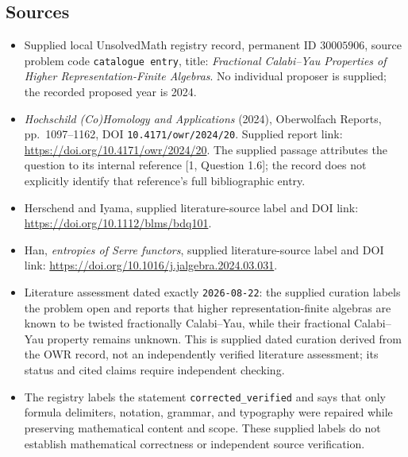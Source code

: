 \documentclass[11pt]{article}
\begin{document}
\subsection{Sources}
\begin{itemize}
\item Supplied local UnsolvedMath registry record, permanent ID \(30005906\), source problem code \texttt{catalogue entry}, title: \emph{Fractional Calabi--Yau Properties of Higher Representation-Finite Algebras}. No individual proposer is supplied; the recorded proposed year is 2024.
\item \emph{Hochschild (Co)Homology and Applications} (2024), Oberwolfach Reports, pp.\ 1097--1162, DOI \texttt{10.4171/owr/2024/20}. Supplied report link: \url{https://doi.org/10.4171/owr/2024/20}. The supplied passage attributes the question to its internal reference [1, Question 1.6]; the record does not explicitly identify that reference's full bibliographic entry.
\item Herschend and Iyama, supplied literature-source label and DOI link: \url{https://doi.org/10.1112/blms/bdq101}.
\item Han, \emph{entropies of Serre functors}, supplied literature-source label and DOI link: \url{https://doi.org/10.1016/j.jalgebra.2024.03.031}.
\item Literature assessment dated exactly \texttt{2026-08-22}: the supplied curation labels the problem open and reports that higher representation-finite algebras are known to be twisted fractionally Calabi--Yau, while their fractional Calabi--Yau property remains unknown. This is supplied dated curation derived from the OWR record, not an independently verified literature assessment; its status and cited claims require independent checking.
\item The registry labels the statement \texttt{corrected\_verified} and says that only formula delimiters, notation, grammar, and typography were repaired while preserving mathematical content and scope. These supplied labels do not establish mathematical correctness or independent source verification.
\end{itemize}
\end{document}
